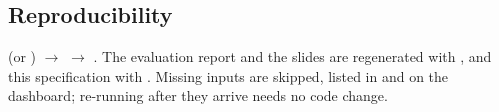 \subsection{Reproducibility}

 (or ) $\rightarrow$  $\rightarrow$ . The evaluation report and the slides are regenerated with , and this specification with . Missing inputs are skipped, listed in  and on the dashboard; re-running after they arrive needs no code change.
